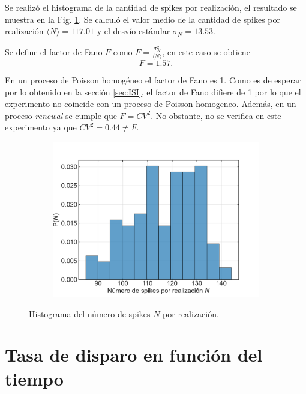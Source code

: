 \documentclass[11pt,twocolumn,twoside]{opticajnl}
\begin{document}
\vspace{0.3cm}

Se realizó el histograma de la cantidad de spikes por realización, el resultado se muestra en la Fig. \ref{fig:histN}. Se calculó el valor medio de la cantidad de spikes por realización $\langle N \rangle = 117.01$ y el desvío estándar $\sigma_N = 13.53$.

Se define el factor de Fano $F$ como $F = \frac{\sigma_N^2}{\langle N \rangle}$, en este caso se obtiene
\begin{equation}
    F = 1.57.
\end{equation}

En un proceso de Poisson homogéneo el factor de Fano es 1. Como es de esperar por lo obtenido en la sección \ref{sec:ISI}, el factor de Fano difiere de 1 por lo que el experimento no coincide con un proceso de Poisson homogeneo. Además, en un proceso \textit{renewal} se cumple que $F = CV^2$. No obstante, no se verifica en este experimento ya que $CV^2 = 0.44 \neq F$.

\begin{figure}[ht]
    \centering
         \begin{subfigure}[b]{\linewidth}
            \includegraphics[width=\textwidth]{Figuras/histograma_spikes.pdf}
         \end{subfigure}
    \caption{Histograma del número de spikes $N$ por realización.} 
    \label{fig:histN}
\end{figure}

\section{Tasa de disparo en función del tiempo}
\end{document}
